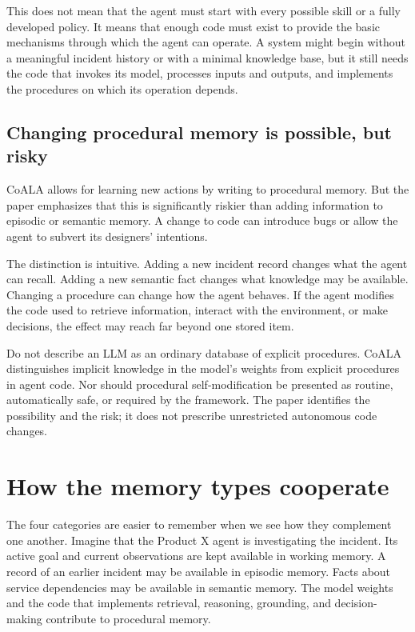 This does not mean that the agent must start with every possible skill or a fully developed policy. It means that enough code must exist to provide the basic mechanisms through which the agent can operate. A system might begin without a meaningful incident history or with a minimal knowledge base, but it still needs the code that invokes its model, processes inputs and outputs, and implements the procedures on which its operation depends.

\subsection{Changing procedural memory is possible, but risky}

CoALA allows for learning new actions by writing to procedural memory. But the paper emphasizes that this is significantly riskier than adding information to episodic or semantic memory. A change to code can introduce bugs or allow the agent to subvert its designers' intentions.

The distinction is intuitive. Adding a new incident record changes what the agent can recall. Adding a new semantic fact changes what knowledge may be available. Changing a procedure can change how the agent behaves. If the agent modifies the code used to retrieve information, interact with the environment, or make decisions, the effect may reach far beyond one stored item.

\begin{warningbox}
Do not describe an LLM as an ordinary database of explicit procedures. CoALA distinguishes implicit knowledge in the model's weights from explicit procedures in agent code. Nor should procedural self-modification be presented as routine, automatically safe, or required by the framework. The paper identifies the possibility and the risk; it does not prescribe unrestricted autonomous code changes.
\end{warningbox}

\section{How the memory types cooperate}
\label{sec:memory-cooperation}

The four categories are easier to remember when we see how they complement one another. Imagine that the Product X agent is investigating the incident. Its active goal and current observations are kept available in working memory. A record of an earlier incident may be available in episodic memory. Facts about service dependencies may be available in semantic memory. The model weights and the code that implements retrieval, reasoning, grounding, and decision-making contribute to procedural memory.

